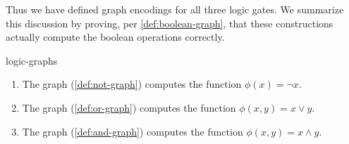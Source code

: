 Thus we have defined graph encodings for all three logic gates.  We
summarize this discussion by proving, per \cref{def:boolean-graph}, that these
constructions actually compute the boolean operations correctly.

\begin{theorem}{}{logic-graphs}

  \begin{enumerate}[nosep]
    \item The \NOT{} graph (\cref{def:not-graph}) computes the function
      \(ϕ(x)=¬x\).
    \item The \OR{} graph (\cref{def:or-graph}) computes the function
      \(ϕ(x,y)=x∨y\).
    \item The \AND{} graph (\cref{def:and-graph}) computes the function
      \(ϕ(x,y)=x∧y\).
  \end{enumerate}

\end{theorem}

